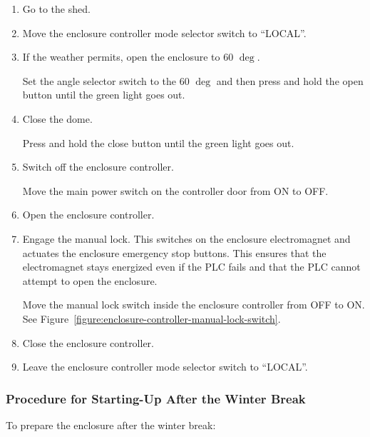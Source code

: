 \begin{enumerate}
\item
Go to the shed.

\item
Move the enclosure controller mode selector switch to “LOCAL”.

\item If the weather permits, open the enclosure to 60 $\deg$.

Set the angle selector switch to the 60 $\deg$ and then press and hold the open button until the green light goes out.

\item Close the dome.

Press and hold the close button until the green light goes out.

\item Switch off the enclosure controller.

Move the main power switch on the controller door from ON to OFF.

\item
Open the enclosure controller.

\item
Engage the manual lock. This switches on the enclosure electromagnet and actuates the enclosure emergency stop buttons. This ensures that the electromagnet stays energized even if the PLC fails and that the PLC cannot attempt to open the enclosure.

Move the manual lock switch inside the enclosure controller from OFF to ON. See Figure~\ref{figure:enclosure-controller-manual-lock-switch}.

\item
Close the enclosure controller.

\item Leave the enclosure controller mode selector switch to “LOCAL”.

\end{enumerate}

\subsubsection{Procedure for Starting-Up After the Winter Break}

To prepare the enclosure after the winter break:

